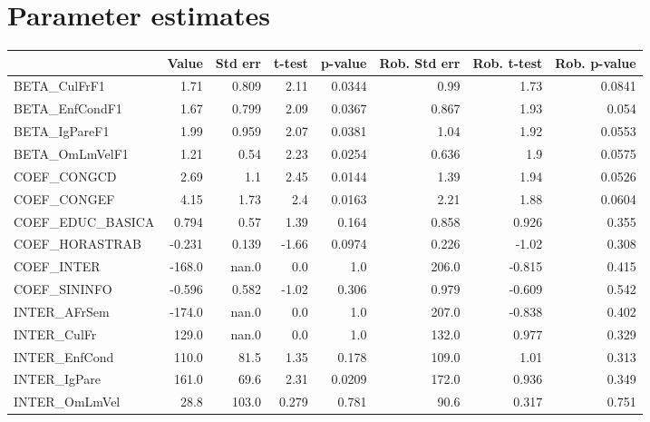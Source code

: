 \section{Parameter estimates}
\begin{tabular}{lrrrrrrr}
\toprule
{} &  Value &  Std err &  t-test &  p-value &  Rob. Std err &  Rob. t-test &  Rob. p-value \\
\midrule
BETA\_CulFrF1       &   1.71 &    0.809 &    2.11 &   0.0344 &          0.99 &         1.73 &        0.0841 \\
BETA\_EnfCondF1     &   1.67 &    0.799 &    2.09 &   0.0367 &         0.867 &         1.93 &         0.054 \\
BETA\_IgPareF1      &   1.99 &    0.959 &    2.07 &   0.0381 &          1.04 &         1.92 &        0.0553 \\
BETA\_OmLmVelF1     &   1.21 &     0.54 &    2.23 &   0.0254 &         0.636 &          1.9 &        0.0575 \\
COEF\_CONGCD        &   2.69 &      1.1 &    2.45 &   0.0144 &          1.39 &         1.94 &        0.0526 \\
COEF\_CONGEF        &   4.15 &     1.73 &     2.4 &   0.0163 &          2.21 &         1.88 &        0.0604 \\
COEF\_EDUC\_BASICA   &  0.794 &     0.57 &    1.39 &    0.164 &         0.858 &        0.926 &         0.355 \\
COEF\_HORASTRAB     & -0.231 &    0.139 &   -1.66 &   0.0974 &         0.226 &        -1.02 &         0.308 \\
COEF\_INTER         & -168.0 &    nan.0 &     0.0 &      1.0 &         206.0 &       -0.815 &         0.415 \\
COEF\_SININFO       & -0.596 &    0.582 &   -1.02 &    0.306 &         0.979 &       -0.609 &         0.542 \\
INTER\_AFrSem       & -174.0 &    nan.0 &     0.0 &      1.0 &         207.0 &       -0.838 &         0.402 \\
INTER\_CulFr        &  129.0 &    nan.0 &     0.0 &      1.0 &         132.0 &        0.977 &         0.329 \\
INTER\_EnfCond      &  110.0 &     81.5 &    1.35 &    0.178 &         109.0 &         1.01 &         0.313 \\
INTER\_IgPare       &  161.0 &     69.6 &    2.31 &   0.0209 &         172.0 &        0.936 &         0.349 \\
INTER\_OmLmVel      &   28.8 &    103.0 &   0.279 &    0.781 &          90.6 &        0.317 &         0.751 \\

\end{tabular}
